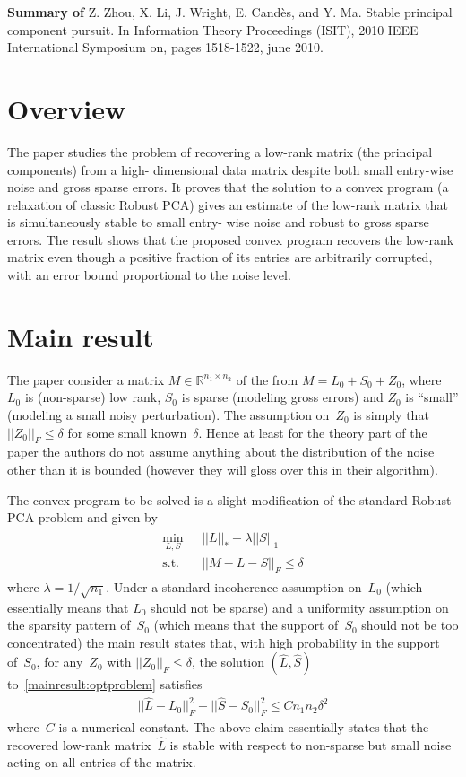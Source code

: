 \documentclass{article}
\begin{document}
\textbf{Summary of} Z. Zhou, X. Li, J. Wright, E. Candès, and Y. Ma. Stable principal component pursuit. In Information Theory Proceedings (ISIT), 2010 IEEE International Symposium on, pages 1518-1522, june 2010.


\section{Overview}

The paper studies the problem of recovering a low-rank matrix (the principal components) from a high- dimensional data matrix despite both small entry-wise noise and gross sparse errors. It proves that the solution to a convex program (a relaxation of classic Robust PCA) gives an estimate of the low-rank matrix that is simultaneously stable to small entry- wise noise and robust to gross sparse errors. The result shows that the proposed convex program recovers the low-rank matrix even though a positive fraction of its entries are arbitrarily corrupted, with an error bound proportional to the noise level. 


\section{Main result}

The paper consider a matrix $M\in\mathbb{R}^{n_1\times n_2}$ of the from $M = L_0+S_0+Z_0$, where~$L_0$ is (non-sparse) low rank, $S_0$ is sparse (modeling gross errors) and $Z_0$ is ``small'' (modeling a small noisy perturbation). The assumption on~$Z_0$ is simply that $||Z_0||_F \leq \delta$ for some small known~$\delta$. Hence at least for the theory part of the paper the authors do not assume anything about the distribution of the noise other than it is bounded (however they will gloss over this in their algorithm). 

The convex program to be solved is a slight modification of the standard Robust PCA problem and given by
\begin{align}
\begin{split}
\min_{L,S} \; &||L||_* + \lambda ||S||_1 \\
\text{s.t.} \quad &||M-L-S||_F \leq \delta
\end{split}
\label{mainresult:optproblem}
\end{align}
where $\lambda = 1/\sqrt{n_1}$. Under a standard incoherence assumption on~$L_0$ (which essentially means that $L_0$ should not be sparse) and a uniformity assumption on the sparsity pattern of~$S_0$ (which means that the support of~$S_0$ should not be too concentrated) the main result states that, with high probability in the support of~$S_0$, for any~$Z_0$ with $||Z_0||_F \leq \delta$, the solution $(\hat{L},\hat{S})$ to~\eqref{mainresult:optproblem} satisfies
\begin{align*}
||\hat{L}-L_0||_F^2 + ||\hat{S}-S_0||_F^2 \leq C n_1n_2\delta^2
\end{align*}
where~$C$ is a numerical constant. The above claim essentially states that the recovered low-rank matrix~$\hat{L}$ is stable with respect to non-sparse but small noise acting on all entries of the matrix.
\end{document}
